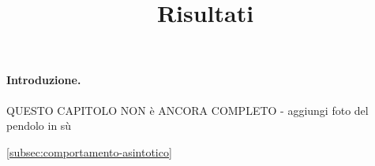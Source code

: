 \title{Risultati}
\maketitle
\label{sec:results}

\paragraph{Introduzione.}

QUESTO CAPITOLO NON è ANCORA COMPLETO
- aggiungi foto del pendolo in sù

\autoref{subsec:comportamento-asintotico}


\relax

